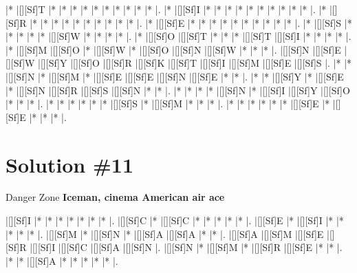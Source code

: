 \documentclass[letterpaper]{article}
\begin{document}
\vspace*{1em}
\begin{Puzzle}{12}{13}
|*        |[][Sf]T  |*        |*        |*        |*        |*        |*        |*        |*        |*        |*        |.
|*        |[][Sf]I  |*        |*        |*        |*        |*        |*        |*        |*        |*        |*        |.
|*        |[][Sf]R  |*        |*        |*        |*        |*        |*        |*        |*        |*        |*        |.
|*        |[][Sf]E  |*        |*        |*        |*        |*        |*        |*        |*        |*        |*        |.
|*        |[][Sf]S  |*        |*        |*        |*        |*        |[][Sf]W  |*        |*        |*        |*        |.
|*        |[][Sf]O  |[][Sf]T  |*        |*        |*        |[][Sf]T  |[][Sf]I  |*        |*        |*        |*        |.
|*        |[][Sf]M  |[][Sf]O  |*        |[][Sf]W  |*        |[][Sf]O  |[][Sf]N  |[][Sf]W   |*        |*        |*        |.
|[][Sf]N  |[][Sf]E  |[][Sf]W  |[][Sf]Y  |[][Sf]O  |[][Sf]R  |[][Sf]K  |[][Sf]T  |[][Sf]I  |[][Sf]M  |[][Sf]E  |[][Sf]S  |.
|*        |*        |[][Sf]N  |*        |[][Sf]M  |*        |[][Sf]E  |[][Sf]E  |[][Sf]N  |[][Sf]E  |*        |*        |.
|*        |*        |[][Sf]Y  |*        |[][Sf]E  |*        |[][Sf]N  |[][Sf]R  |[][Sf]S  |[][Sf]N  |*        |*        |.
|*        |*        |*        |*        |[][Sf]N  |*        |[][Sf]I  |[][Sf]Y  |[][Sf]O  |*        |*        |*        |.
|*        |*        |*        |*        |*        |*        |[][Sf]S  |*        |[][Sf]M  |*        |*        |*        |.
|*        |*        |*        |*        |*        |*        |[][Sf]E  |*        |[][Sf]E  |*        |*        |*        |.
\end{Puzzle}

\newpage
\section*{Solution \#11}
Danger Zone
\newline\textbf{Iceman, cinema American air ace}

\vspace*{1em}
\begin{Puzzle}{8}{7}
|[][Sf]I  |*        |*        |*        |*        |*        |*        |*        |. 
|[][Sf]C  |*        |[][Sf]C  |*        |*        |*        |*        |*        |.  
|[][Sf]E  |*        |[][Sf]I  |*        |*        |*        |*        |*        |.
|[][Sf]M  |*        |[][Sf]N  |*        |[][Sf]A  |[][Sf]A  |*        |*        |.  
|[][Sf]A  |[][Sf]M  |[][Sf]E  |[][Sf]R  |[][Sf]I  |[][Sf]C  |[][Sf]A  |[][Sf]N  |.
|[][Sf]N  |*        |[][Sf]M  |*        |[][Sf]R  |[][Sf]E  |*        |*        |. 
|*        |*        |[][Sf]A  |*        |*        |*        |*        |*        |.
\end{Puzzle}
\end{document}
